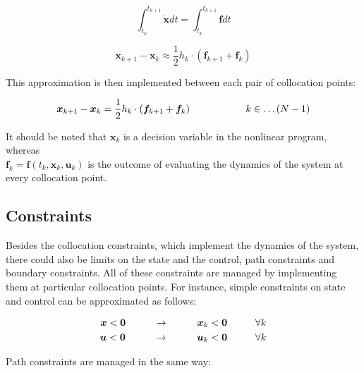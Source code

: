 \documentclass{thesisreport}
\begin{document}
 \begin{equation*}
\int_{t_k}^{t_{k+1}} \dot{\bm{x}}dt = \int_{t_k}^{t_{k+1}} \bm{f}dt
\end{equation*}
 
  \begin{equation*}
\bm{x}_{k+1}-\bm{x}_k \approx \frac{1}{2} h_k \cdot (\bm{f}_{k+1} + \bm{f}_k )
\end{equation*}
 
 This approximation is then implemented between each pair of collocation points: 
 
 \begin{equation}\label{system_dynamics_equation}
 \bm{x}_{k+1} - \bm{x}_k = \frac{1}{2} h_k \cdot (\bm{f}_{k+1} + \bm{f}_k ) \text{\hspace{2cm}}  k \in \ldots(N-1)
 \end{equation}
 
 \noindent It should be noted that $\bm{x}_k$ is a decision variable in the nonlinear program, whereas \\ $\bm{f}_k = \bm{f}(t_k, \bm{x}_k, \bm{u}_k)$ is the outcome of evaluating the dynamics of the system at every collocation point.
 

\subsection{Constraints} 
 
Besides the collocation constraints, which implement the dynamics of the system, there could also be limits on the state and the control, path constraints and boundary constraints. All of these constraints are managed by implementing them at particular collocation points. For instance, simple constraints on state and control can be approximated as follows:

\begin{align}
\bm{x}< \bm{0} \text{\hspace{1cm}} \rightarrow \text{\hspace{1cm}} \bm{x}_k <\bm{0} \text{\hspace{1cm}} \forall k \\
\bm{u}< \bm{0} \text{\hspace{1cm}} \rightarrow \text{\hspace{1cm}} \bm{u}_k <\bm{0} \text{\hspace{1cm}} \forall k 
\end{align}
 
 Path constraints are managed in the same way: 
 
\end{document}

